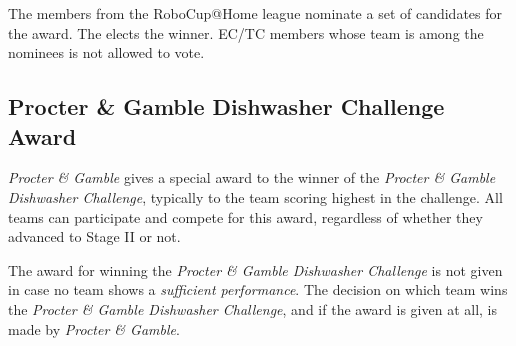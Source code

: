 The  members from the RoboCup@Home league 
nominate a set of candidates for the award. The  elects the winner. EC/TC members whose team is among the 
nominees is not allowed to vote.


\subsection{Procter \& Gamble Dishwasher Challenge Award}
\label{award:skill}
\textit{Procter \& Gamble} gives a special award to the winner of the 
\textit{Procter \& Gamble Dishwasher Challenge}, typically to the team scoring 
highest in the challenge.
All teams can participate and compete for this award, regardless of whether 
they advanced to Stage II or not.

The award for winning the \textit{Procter \& Gamble Dishwasher Challenge} is 
not given in case no team shows a \emph{sufficient performance}. The decision 
on which team wins the \textit{Procter \& Gamble Dishwasher Challenge}, and if 
the award is given at all, is made by \textit{Procter \& Gamble}.
